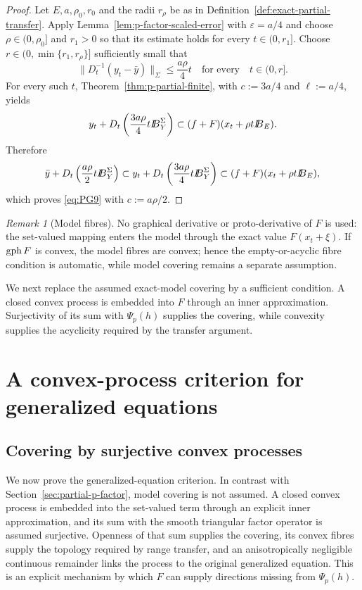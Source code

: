 \documentclass[11pt]{amsart}
\theoremstyle{definition}
\theoremstyle{remark}
\newtheorem{remark}[theorem]{Remark}
\newcommand{\by}{\bar y}
\newcommand{\gph}{\mathop{\rm gph}\nolimits}
\def\ball{{I\kern -.35em B}}
\begin{document}
	\begin{proof}
		Let $E,a,\rho_0,r_0$ and the radii $r_\rho$ be as in
		Definition~\ref{def:exact-partial-transfer}. Apply
		Lemma~\ref{lem:p-factor-scaled-error} with $\varepsilon=a/4$ and choose
		$\rho\in(0,\rho_0]$ and $r_1>0$ so that its estimate holds for every
		$t\in(0,r_1]$.  Choose $r\in(0,\min\{r_1,r_\rho\}]$ sufficiently small
		that
		$$
		\|D_t^{-1}(y_t-\by)\|_{\Sigma}
		\le\frac{a\rho}{4}t
		\quad\text{for every} \quad t\in(0,r].
		$$
		For every such $t$, Theorem~\ref{thm:p-partial-finite}, with
		$c:=3a/4$ and $\ell:=a/4$, yields
		$$
		y_t+D_t\left(\frac{3a\rho}{4}t\ball_Y^{\Sigma}\right)
		\subset(f+F)(x_t+\rho t\ball_E).
		$$
		Therefore
		$$
		\by+D_t\left(\frac{a\rho}{2}t\ball_Y^\Sigma\right)
		\subset
		y_t+D_t\left(\frac{3a\rho}{4}t\ball_Y^\Sigma\right)
		\subset(f+F)(x_t+\rho t\ball_E),
		$$
		which proves \eqref{eq:PG9} with $c:=a\rho/2$.
	\end{proof}
	
	\begin{remark}[Model fibres]
		No graphical derivative or proto-derivative of $F$ is used: the
		set-valued mapping enters the model through the exact value $F(x_t+\xi)$.  If
		$\gph F$ is convex, the model fibres are convex; hence the
		empty-or-acyclic fibre condition is automatic, while model covering remains
		a separate assumption.
	\end{remark}
	
	We next replace the assumed exact-model covering by a sufficient condition. A closed convex process is embedded into $F$ through an inner
	approximation. Surjectivity of its sum with $\Psi_p(h)$ supplies the
	covering, while convexity supplies the acyclicity required by the transfer
	argument.
	
	
	\section{A convex-process criterion for generalized equations}
	\label{sec:process-criterion}
	
	\subsection{Covering by surjective convex processes}
	
	We now prove the generalized-equation criterion. In contrast with
	Section~\ref{sec:partial-p-factor}, model covering is not assumed. A closed
	convex process is embedded into the set-valued term through an explicit
	inner approximation, and its sum with the smooth triangular factor operator
	is assumed surjective. Openness of that sum supplies the covering, its
	convex fibres supply the topology required by range transfer, and an
	anisotropically negligible continuous remainder links the process to the
	original generalized equation. This is an explicit mechanism by which $F$ can supply directions missing
	from $\Psi_p(h)$.
	
\end{document}
